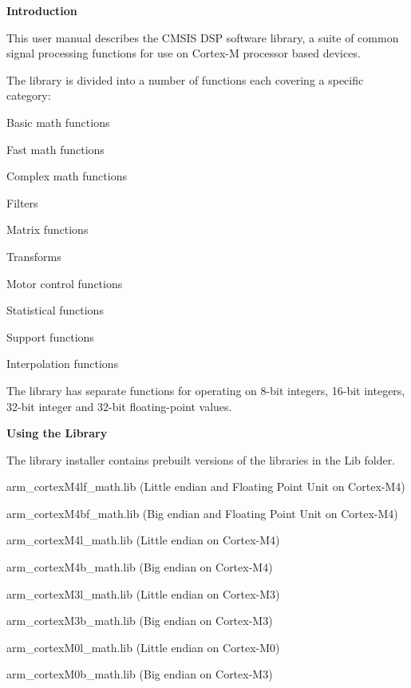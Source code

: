 {\bfseries{Introduction}}

This user manual describes the C\+M\+S\+IS D\+SP software library, a suite of common signal processing functions for use on Cortex-\/M processor based devices.

The library is divided into a number of functions each covering a specific category\+:
\begin{DoxyItemize}
\item Basic math functions
\item Fast math functions
\item Complex math functions
\item Filters
\item Matrix functions
\item Transforms
\item Motor control functions
\item Statistical functions
\item Support functions
\item Interpolation functions
\end{DoxyItemize}

The library has separate functions for operating on 8-\/bit integers, 16-\/bit integers, 32-\/bit integer and 32-\/bit floating-\/point values.

{\bfseries{Using the Library}}

The library installer contains prebuilt versions of the libraries in the {\ttfamily Lib} folder.
\begin{DoxyItemize}
\item arm\+\_\+cortex\+M4lf\+\_\+math.\+lib (Little endian and Floating Point Unit on Cortex-\/\+M4)
\item arm\+\_\+cortex\+M4bf\+\_\+math.\+lib (Big endian and Floating Point Unit on Cortex-\/\+M4)
\item arm\+\_\+cortex\+M4l\+\_\+math.\+lib (Little endian on Cortex-\/\+M4)
\item arm\+\_\+cortex\+M4b\+\_\+math.\+lib (Big endian on Cortex-\/\+M4)
\item arm\+\_\+cortex\+M3l\+\_\+math.\+lib (Little endian on Cortex-\/\+M3)
\item arm\+\_\+cortex\+M3b\+\_\+math.\+lib (Big endian on Cortex-\/\+M3)
\item arm\+\_\+cortex\+M0l\+\_\+math.\+lib (Little endian on Cortex-\/\+M0)
\item arm\+\_\+cortex\+M0b\+\_\+math.\+lib (Big endian on Cortex-\/\+M3)
\end{DoxyItemize}

